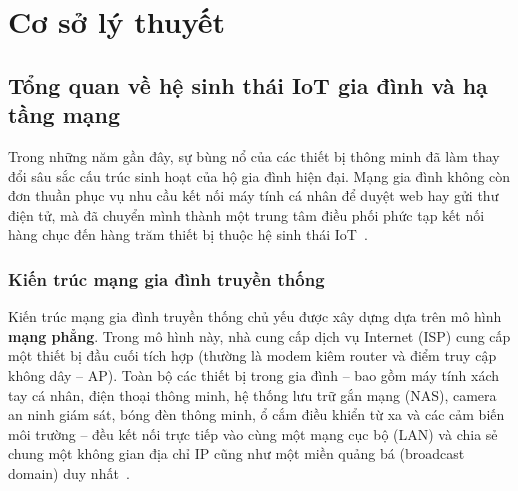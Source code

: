 
\chapter{Cơ sở lý thuyết}
\label{chap:co-so-ly-thuyet}

\section{Tổng quan về hệ sinh thái IoT gia đình và hạ tầng mạng}
\label{sec:tong-quan-iot-va-ha-tang}

Trong những năm gần đây, sự bùng nổ của các thiết bị thông minh đã làm thay đổi sâu sắc cấu trúc sinh hoạt của hộ gia đình hiện đại. Mạng gia đình không còn đơn thuần phục vụ nhu cầu kết nối máy tính cá nhân để duyệt web hay gửi thư điện tử, mà đã chuyển mình thành một trung tâm điều phối phức tạp kết nối hàng chục đến hàng trăm thiết bị thuộc hệ sinh thái IoT~\cite{alfuqaha2015internet}.

\subsection{Kiến trúc mạng gia đình truyền thống}
\label{subsec:mang-gia-dinh-truyen-thong}

Kiến trúc mạng gia đình truyền thống chủ yếu được xây dựng dựa trên mô hình \textbf{mạng phẳng}. Trong mô hình này, nhà cung cấp dịch vụ Internet (ISP) cung cấp một thiết bị đầu cuối tích hợp (thường là modem kiêm router và điểm truy cập không dây -- AP). Toàn bộ các thiết bị trong gia đình -- bao gồm máy tính xách tay cá nhân, điện thoại thông minh, hệ thống lưu trữ gắn mạng (NAS), camera an ninh giám sát, bóng đèn thông minh, ổ cắm điều khiển từ xa và các cảm biến môi trường -- đều kết nối trực tiếp vào cùng một mạng cục bộ (LAN) và chia sẻ chung một không gian địa chỉ IP cũng như một miền quảng bá (broadcast domain) duy nhất~\cite{kurose2021computer, tanenbaum2011computer}.

